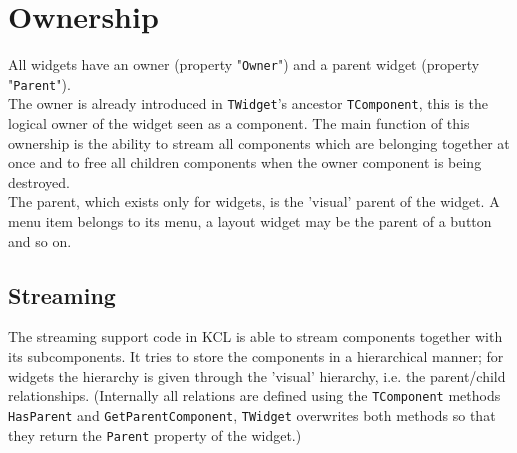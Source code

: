 \section{Ownership}
All widgets have an owner (property "\texttt{Owner}") and a parent widget
(property "\texttt{Parent}").
\\ The owner is already introduced in \texttt{TWidget}'s ancestor
\texttt{TComponent}, this is the logical owner of the widget seen as a
component. The main function of this ownership is the ability to stream all
components which are belonging together at once and to free all children
components when the owner component is being destroyed.
\\ The parent, which exists only for widgets, is the 'visual' parent of the
widget. A menu item belongs to its menu, a layout widget may be the parent
of a button and so on.
\subsection{Streaming}
The streaming support code in KCL is able to stream components together with
its subcomponents. It tries to store the components in a hierarchical manner;
for widgets the hierarchy is given through the 'visual' hierarchy, i.e. the
parent/child relationships. (Internally all relations are defined using the
\texttt{TComponent} methods \texttt{HasParent} and \texttt{GetParentComponent},
\texttt{TWidget} overwrites both methods so that they return the \texttt{Parent}
property of the widget.)

